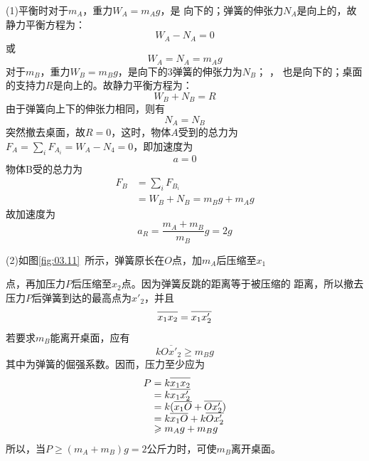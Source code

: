 \solution (1)平衡时对于$ m_A $，重力$ W _ { A } = m _ { A } g $，是
向下的；弹簧的伸张力$ N _ { A } $是向上的，故静力平衡方程为：\vspace{-0.5em}
\begin{equation*}
	W _ { A } - N _ { A } = 0
\end{equation*}
或\vspace{-1.56em}
\begin{equation*}
	W _ { A } = N _ { A } = m _ { A } g
\end{equation*}
对于$ m_B $，重力$ W _ { B } = m _ { B } g $，是向下的3弹簧的伸张力为$ N _ { B } $； ，
也是向下的；桌面的支持力$ R $是向上的。故静力平衡方程为：
\begin{equation*}
	W _ { B } + N _ { B } = R
\end{equation*}
由于弹簧向上下的伸张力相同，则有
\begin{equation*}
	N _ { A } = N _ { B }
\end{equation*}
突然撤去桌面，故$  R = 0  $，这时，物体$ A $受到的总力为$  F _ { A } =
\sum _ i F _ { A _ i } = W _ { A } - N _ { 4 } = 0  $，即加速度为
\begin{equation*}
	a = 0
\end{equation*}
物体B受的总力为
\begin{align*}
	F _ { B } &= \sum _ i F _ { B _ i } \\
		&= W _ { B } + N _ { B } = m _ { B } g + m _ { A } g
\end{align*}
故加速度为
\begin{equation*}
	a _ { R } = \frac { m _ { A } + m _ { B } } { m _ { B } } g = 2 g
\end{equation*}

(2)如图\ref{fig:03.11}~所示，弹簧原长在$ O $点，加$ m_{A} $后压缩至$ x_{1} $

\noindent 点，再加压力$ P $后压缩至$ x_{2} $点。因为弹簧反跳的距离等于被压缩的
距离，所以撤去压力$ P $后弹簧到达的最高点为$  x'_ { 2 }  $，并且
\begin{equation*}
	\overline{ x _ { 1 } x _ { 2 } \llap{\phantom{'}} } = \overline{ x _ { 1 } x' _ { 2 }}
\end{equation*}
若要求$ m_B $能离开桌面，应有
\begin{equation*}
	k \overline{ O x' _ { 2 } } \geqslant m _ { B } g
\end{equation*}
其中为弹簧的倔强系数。因而，压力至少应为
\begin{align*}
	P &= k \overline{ x _ { 1 } x _ { 2 } \llap{\phantom{'}}} \\[-0.5em]
	  &= k \overline{ x _ { 1 } x ' _ { 2 } } \\[-0.5em]
	  &= k ( \overline{ x _ { 1 } O \llap{\phantom{'}} } + \overline{ O x ' _ { 2 } } ) \\[-0.5em]
	  &= k \overline { x _ { 1 } O \llap{\phantom{'}}} + k \overline { O x '_2} \\[-0.5em]
	  &\geqslant m _ { A } g + m _ { B } g
\end{align*}
所以，当$  P \geqslant ( m _ { A } + m _ { B } ) g = 2 \text{公斤力} $时，可使$ m_{B} $离开桌面。


